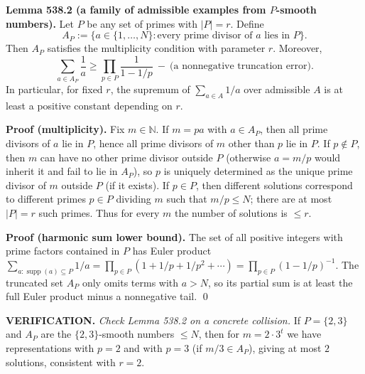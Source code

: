 \medskip
\textbf{Lemma 538.2 (a family of admissible examples from $P$-smooth numbers).}
Let $P$ be any set of primes with $|P|=r$.
Define
\[
A_P:=\{a\in\{1,\dots,N\}: \text{every prime divisor of $a$ lies in $P$}\}.
\]
Then $A_P$ satisfies the multiplicity condition with parameter $r$.
Moreover,
\[
\sum_{a\in A_P}\frac1a \ge \prod_{p\in P}\frac{1}{1-1/p}\ -\ \text{(a nonnegative truncation error)}.
\]
In particular, for fixed $r$, the supremum of $\sum_{a\in A}1/a$ over admissible $A$ is at least a positive constant depending on $r$.

\textbf{Proof (multiplicity).}
Fix $m\in\mathbb N$.
If $m=pa$ with $a\in A_P$, then all prime divisors of $a$ lie in $P$, hence all prime divisors of $m$ other than $p$ lie in $P$.
If $p\notin P$, then $m$ can have no other prime divisor outside $P$ (otherwise $a=m/p$ would inherit it and fail to lie in $A_P$), so $p$ is uniquely determined as the unique prime divisor of $m$ outside $P$ (if it exists).
If $p\in P$, then different solutions correspond to different primes $p\in P$ dividing $m$ such that $m/p\le N$; there are at most $|P|=r$ such primes.
Thus for every $m$ the number of solutions is $\le r$.

\textbf{Proof (harmonic sum lower bound).}
The set of all positive integers with prime factors contained in $P$ has Euler product
\(
\sum_{a: \operatorname{supp}(a)\subseteq P} 1/a = \prod_{p\in P} (1+1/p+1/p^2+\cdots)=\prod_{p\in P} (1-1/p)^{-1}.
\)
The truncated set $A_P$ only omits terms with $a>N$, so its partial sum is at least the full Euler product minus a nonnegative tail. \qed

\noindent\textbf{VERIFICATION.}
\emph{Check Lemma 538.2 on a concrete collision.}
If $P=\{2,3\}$ and $A_P$ are the $\{2,3\}$-smooth numbers $\le N$, then for $m=2\cdot 3^t$ we have representations with $p=2$ and with $p=3$ (if $m/3\in A_P$), giving at most $2$ solutions, consistent with $r=2$.

